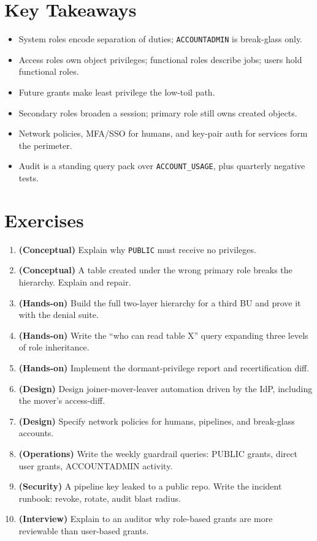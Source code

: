 \section*{Key Takeaways}
\begin{itemize}
    \item System roles encode separation of duties; \texttt{ACCOUNTADMIN} is break-glass only.
    \item Access roles own object privileges; functional roles describe jobs; users hold functional roles.
    \item Future grants make least privilege the low-toil path.
    \item Secondary roles broaden a session; primary role still owns created objects.
    \item Network policies, MFA/SSO for humans, and key-pair auth for services form the perimeter.
    \item Audit is a standing query pack over \texttt{ACCOUNT\_USAGE}, plus quarterly negative tests.
\end{itemize}

\section{Exercises}
\begin{enumerate}
    \item \textbf{(Conceptual)} Explain why \texttt{PUBLIC} must receive no privileges.
    \item \textbf{(Conceptual)} A table created under the wrong primary role breaks the hierarchy. Explain and repair.
    \item \textbf{(Hands-on)} Build the full two-layer hierarchy for a third BU and prove it with the denial suite.
    \item \textbf{(Hands-on)} Write the ``who can read table X'' query expanding three levels of role inheritance.
    \item \textbf{(Hands-on)} Implement the dormant-privilege report and recertification diff.
    \item \textbf{(Design)} Design joiner-mover-leaver automation driven by the IdP, including the mover's access-diff.
    \item \textbf{(Design)} Specify network policies for humans, pipelines, and break-glass accounts.
    \item \textbf{(Operations)} Write the weekly guardrail queries: PUBLIC grants, direct user grants, ACCOUNTADMIN activity.
    \item \textbf{(Security)} A pipeline key leaked to a public repo. Write the incident runbook: revoke, rotate, audit blast radius.
    \item \textbf{(Interview)} Explain to an auditor why role-based grants are more reviewable than user-based grants.
\end{enumerate}
